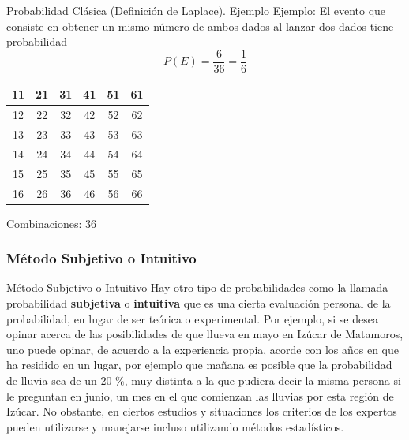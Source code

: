 \documentclass[11pt]{beamer}
\begin{document}
         \begin{frame}{Probabilidad Clásica (Definición de Laplace). Ejemplo}
             Ejemplo: El evento que consiste en obtener un mismo número de ambos dados al lanzar dos dados tiene probabilidad
             $$P(E) = \dfrac{6}{36} = \dfrac{1}{6}$$
             \pause
             \begin{table}[!h]
               \centering
               \begin{tabular}{|c|c|c|c|c|c|}
                   \hline
                   \cellcolor{blue!25} 11 & 21 & 31 & 41 & 51 & 61 \\
                   \hline
                   12 & \cellcolor{blue!25} 22 & 32 & 42 & 52 & 62 \\
                   \hline
                   13 & 23 & \cellcolor{blue!25} 33 & 43 & 53 & 63 \\
                   \hline
                   14 & 24 & 34 & \cellcolor{blue!25} 44 & 54 & 64 \\
                   \hline
                   15 & 25 & 35 & 45 & \cellcolor{blue!25} 55 & 65 \\
                   \hline
                   16 & 26 & 36 & 46 & 56 & \cellcolor{blue!25} 66 \\
                   \hline
               \end{tabular}
             \end{table}
             \begin{center}
                 Combinaciones: 36
             \end{center}
         \end{frame}





        \subsubsection*{Método Subjetivo o Intuitivo}
          \begin{frame}{Método Subjetivo o Intuitivo}
            Hay otro tipo de probabilidades como la llamada probabilidad \textbf{subjetiva} o \textbf{intuitiva} que es una cierta evaluación personal de la probabilidad, en lugar de ser teórica o experimental. Por ejemplo, si se desea opinar acerca de las posibilidades de que llueva en mayo en Izúcar de Matamoros, uno puede opinar, de acuerdo a la experiencia propia, acorde con los años en que ha residido en un lugar, por ejemplo que mañana es posible que la probabilidad de lluvia sea de un 20 \%, muy distinta a la que pudiera decir la misma persona si le preguntan en junio, un mes en el que comienzan las lluvias por esta región de Izúcar. No obstante, en ciertos estudios y situaciones los criterios de los expertos pueden utilizarse y manejarse incluso utilizando métodos estadísticos.
          \end{frame}
\end{document}
